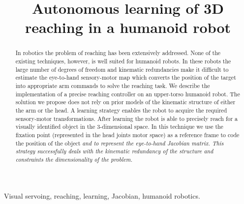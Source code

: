 \documentclass[conference,letterpaper]{ieeeconf}
\begin{document}
\title{\huge Autonomous learning of 3D reaching in a humanoid robot}

\author{
\and
{}
}

\maketitle
\begin{abstract}
In robotics the problem of reaching has been extensively addressed. None 
of the existing techniques, however, is well suited for humanoid robots.
In these robots the large number of degrees of freedom and kinematic 
redundancies make it difficult to estimate the eye-to-hand 
sensory-motor map which converts the position of the target into 
appropriate arm commands to solve the reaching task. We describe the 
implementation of a precise reaching controller on an upper-torso humanoid 
robot. The solution we propose does not rely on prior models of the 
kinematic structure of either the arm or the head. A learning strategy 
enables the robot to acquire the required sensory-motor transformations.
After learning the robot is able to precisely reach for a visually identified
object in the 3-dimensional space. In this technique we use the fixation point 
(represented in the head joints motor space) as a reference frame 
to code the position of the object \em{and} to represent the eye-to-hand 
Jacobian matrix. This strategy successfully deals with the kinematic
redundancy of the structure and constraints the dimensionality of the 
problem.
\end{abstract}

\begin{keywords}
Visual servoing, reaching, learning, Jacobian, humanoid robotics.
\end{keywords}
%







%



\end{document}
